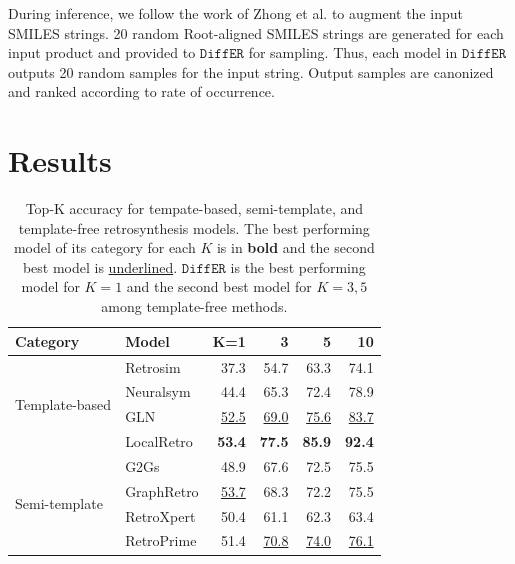 \documentclass{article}
\newcommand{\ours}{$\texttt{DiffER}$\xspace}
\begin{document}
During inference, we follow the work of Zhong et al. \cite{zhong2022root} to augment the input SMILES strings. 20 random Root-aligned SMILES strings are generated for each input product and provided to \ours for sampling. Thus, each model in \ours outputs 20 random samples for the input string. Output samples are canonized and ranked according to rate of occurrence.

\section{Results}
\label{sec:results}

\begin{table}[h!]
    \small
    \centering
    \caption{Top-K accuracy for tempate-based, semi-template, and template-free retrosynthesis models. The best performing model of its category for each $K$ is 
    in \textbf{bold} and the second best model is \underline{underlined}. \ours is the best performing model for $K=1$ and the second best model for $K=3,5$ among template-free methods.}
    \begin{tabular}{l l r r r r}
        \toprule
         Category & Model & K=1 & 3 & 5 & 10 \\
        \midrule
        \multirow{4}{*}{Template-based} & Retrosim \cite{coley2017computer} & 37.3 & 54.7 & 63.3 & 74.1 \\
                                           & Neuralsym \cite{segler2017neural} & 44.4 & 65.3 & 72.4 & 78.9 \\
                                           & GLN \cite{dai2019retrosynthesis} & \underline{52.5} & \underline{69.0} & \underline{75.6} & \underline{83.7} \\
                                           & LocalRetro \cite{chen2021deep} & \textbf{53.4} & \textbf{77.5} & \textbf{85.9} & \textbf{92.4} \\
        \midrule
        \multirow{5}{*}{Semi-template} & G2Gs \cite{shi2020graph} & 48.9 & 67.6 & 72.5 & 75.5 \\
                                          & GraphRetro \cite{somnath2021learning} & \underline{53.7} & 68.3 & 72.2 & 75.5 \\
                                          & RetroXpert \cite{yan2020retroxpert} & 50.4 & 61.1 & 62.3 & 63.4 \\
                                          & RetroPrime \cite{wang2021retroprime} & 51.4 & \underline{70.8} & \underline{74.0} & \underline{76.1} \\

\end{tabular}
\end{table}
\end{document}
